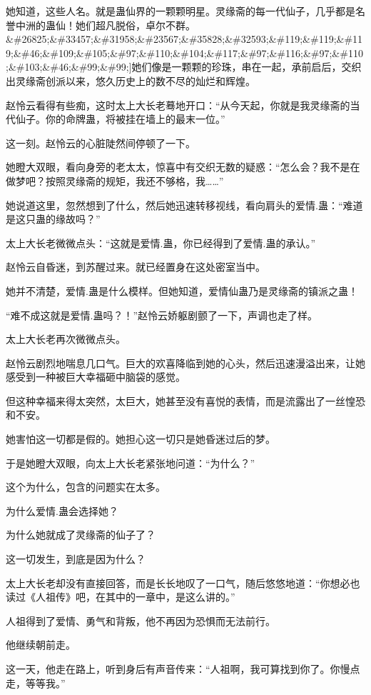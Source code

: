 \begin{this_body}
她知道，这些人名。就是蛊仙界的一颗颗明星。灵缘斋的每一代仙子，几乎都是名誉中洲的蛊仙！她们超凡脱俗，卓尔不群。\&\#26825;\&\#33457;\&\#31958;\&\#23567;\&\#35828;\&\#32593;\&\#119;\&\#119;\&\#119;\&\#46;\&\#109;\&\#105;\&\#97;\&\#110;\&\#104;\&\#117;\&\#97;\&\#116;\&\#97;\&\#110;\&\#103;\&\#46;\&\#99;\&\#99;]她们像是一颗颗的珍珠，串在一起，承前启后，交织出灵缘斋创派以来，悠久历史上的数不尽的灿烂和辉煌。

赵怜云看得有些痴，这时太上大长老蓦地开口：“从今天起，你就是我灵缘斋的当代仙子。你的命牌蛊，将被挂在墙上的最末一位。”

这一刻。赵怜云的心脏陡然间停顿了一下。

她瞪大双眼，看向身旁的老太太，惊喜中有交织无数的疑惑：“怎么会？我不是在做梦吧？按照灵缘斋的规矩，我还不够格，我……”

她说道这里，忽然想到了什么，然后她迅速转移视线，看向肩头的爱情.蛊：“难道是这只蛊的缘故吗？”

太上大长老微微点头：“这就是爱情.蛊，你已经得到了爱情.蛊的承认。”

赵怜云自昏迷，到苏醒过来。就已经置身在这处密室当中。

她并不清楚，爱情.蛊是什么模样。但她知道，爱情仙蛊乃是灵缘斋的镇派之蛊！

“难不成这就是爱情.蛊吗？！”赵怜云娇躯剧颤了一下，声调也走了样。

太上大长老再次微微点头。

赵怜云剧烈地喘息几口气。巨大的欢喜降临到她的心头，然后迅速漫溢出来，让她感受到一种被巨大幸福砸中脑袋的感觉。

但这种幸福来得太突然，太巨大，她甚至没有喜悦的表情，而是流露出了一丝惶恐和不安。

她害怕这一切都是假的。她担心这一切只是她昏迷过后的梦。

于是她瞪大双眼，向太上大长老紧张地问道：“为什么？”

这个为什么，包含的问题实在太多。

为什么爱情.蛊会选择她？

为什么她就成了灵缘斋的仙子了？

这一切发生，到底是因为什么？

太上大长老却没有直接回答，而是长长地叹了一口气，随后悠悠地道：“你想必也读过《人祖传》吧，在其中的一章中，是这么讲的。”

人祖得到了爱情、勇气和背叛，他不再因为恐惧而无法前行。

他继续朝前走。

这一天，他走在路上，听到身后有声音传来：“人祖啊，我可算找到你了。你慢点走，等等我。”


\end{this_body}
